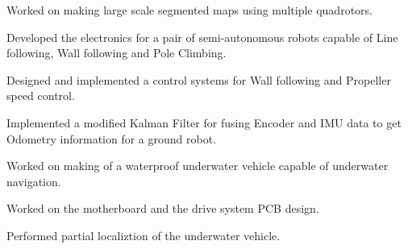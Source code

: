 \documentclass[]{deedy-resume-openfont}
\begin{document}
\begin{minipage}[t]{0.66\textwidth}
\begin{tightemize}
\item Worked on making large scale segmented maps using multiple quadrotors.
\end{tightemize}

\begin{tightemize}
\item Developed the electronics for a pair of semi-autonomous robots capable of Line following, Wall following and Pole Climbing. \item  Designed and implemented a control systems for Wall following and Propeller speed control. \item Implemented a modified Kalman Filter for fusing Encoder and IMU data to get Odometry information for a ground robot.\end{tightemize}
\sectionsep

\begin{tightemize}
\item Worked on making of a waterproof underwater vehicle capable of underwater navigation.\item Worked on the motherboard and the drive system PCB design.\item Performed partial localiztion of the underwater vehicle.\end{tightemize}

%
%


\end{minipage}
\end{document}
